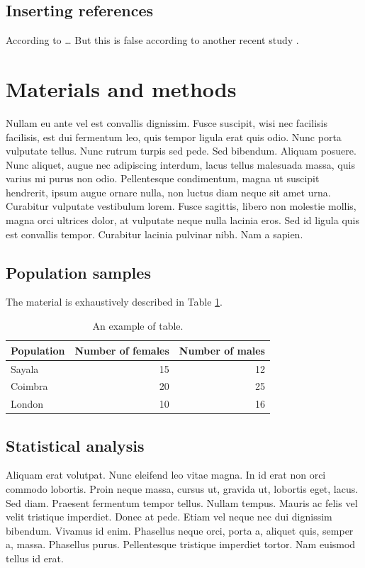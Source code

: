 \documentclass[APA,LATO1COL]{WileyNJD-v2}
\begin{document}
\subsection{Inserting references}
\label{sec:org94de60a}
According to \cite{adams2019_PhylogeneticComparativeMethods}\ldots{} But this is false according to another recent study \citep{aczel2020_DiscussionPointsBayesian}.

\section{Materials and methods}
\label{sec:orgcad857e}
Nullam eu ante vel est convallis dignissim.  Fusce suscipit, wisi nec facilisis facilisis, est dui fermentum leo, quis tempor ligula erat quis odio.  Nunc porta vulputate tellus.  Nunc rutrum turpis sed pede.  Sed bibendum.  Aliquam posuere.  Nunc aliquet, augue nec adipiscing interdum, lacus tellus malesuada massa, quis varius mi purus non odio.  Pellentesque condimentum, magna ut suscipit hendrerit, ipsum augue ornare nulla, non luctus diam neque sit amet urna.  Curabitur vulputate vestibulum lorem.  Fusce sagittis, libero non molestie mollis, magna orci ultrices dolor, at vulputate neque nulla lacinia eros.  Sed id ligula quis est convallis tempor.  Curabitur lacinia pulvinar nibh.  Nam a sapien.

\subsection{Population samples}
\label{sec:org319721a}
The material is exhaustively described in Table \ref{tab-material}.

\begin{table}[htbp]
\centering
\begin{tabular}{lrr}
\hline
Population & Number of females & Number of males\\
\hline
Sayala & 15 & 12\\
Coimbra & 20 & 25\\
London & 10 & 16\\
\hline
\end{tabular}
\caption{An example of table. \label{tab-material}}

\end{table}

\subsection{Statistical analysis}
\label{sec:org0f7b430}
Aliquam erat volutpat.  Nunc eleifend leo vitae magna.  In id erat non orci commodo lobortis.  Proin neque massa, cursus ut, gravida ut, lobortis eget, lacus.  Sed diam.  Praesent fermentum tempor tellus.  Nullam tempus.  Mauris ac felis vel velit tristique imperdiet.  Donec at pede.  Etiam vel neque nec dui dignissim bibendum.  Vivamus id enim.  Phasellus neque orci, porta a, aliquet quis, semper a, massa.  Phasellus purus.  Pellentesque tristique imperdiet tortor.  Nam euismod tellus id erat.
\end{document}
